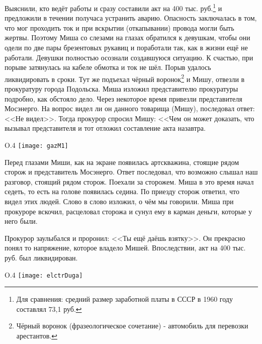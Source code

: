 Выяснили, кто ведёт работы и сразу составили акт на 400 тыс. руб.\footnote{Для сравнения: средний размер заработной платы в СССР в 1960 году составлял 73,1 руб.} и предложили в течении получаса устранить аварию. Опасность заключалась в том, что мог проходить ток и при вскрытии (откапывании) провода могли быть жертвы. Поэтому Миша со слезами на глазах обратился к девушкам, чтобы они одели по две пары брезентовых рукавиц и поработали так, как в жизни ещё не работали. Девушки полностью осознали создавшуюся ситуацию. К счастью, при порыве затянулась на кабеле обмотка и ток не шёл. Порыв удалось ликвидировать в сроки. Тут же подъехал чёрный воронок\footnote{Чёрный воронок (фразеологическое сочетание) - автомобиль для перевозки арестантов.} и Мишу, отвезли в прокуратуру города Подольска. Миша изложил представителю прокуратуры подробно, как обстояло дело. Через некоторое время привезли представителя Мосэнерго. На вопрос видел ли он данного товарища (Мишу), последовал ответ: <<Не видел>>. Тогда прокурор спросил Мишу: <<Чем он может доказать, что вызывал представителя и тот отложил составление акта назавтра.

\begin{wrapfigure}{O}{.4\textwidth}
\centering
\texttt{[image: gazM1]}
\caption[Чёрный воронок. Автомобиль ГАЗ-М\=/1 в Музее отечественной военной истории.]{Чёрный воронок. Автомобиль ГАЗ-М\=/1 в Музее отечественной военной истории\footnotemark.}
\label{fig:gazM1}
\end{wrapfigure}

Перед глазами Миши, как на экране появилась артскважина, стоящие рядом сторож и представитель Мосэнерго. Ответ последовал, что возможно слышал наш разговор, стоящий рядом сторож. Поехали за сторожем. Миша в это время начал седеть, то есть на голове появилась седина. По приезду сторож ответил, что видел этих людей. Слово в слово изложил, о чём мы говорили. Миша при прокуроре вскочил, расцеловал сторожа и сунул ему в карман деньги, которые у него были.

Прокурор заулыбался и проронил: <<Ты ещё даёшь взятку>>. Он прекрасно понял то напряжение, которое владело Мишей. Впоследствии, акт на 400 тыс. руб. был ликвидирован.

\begin{wrapfigure}{O}{.4\textwidth}
\centering
\texttt{[image: elctrDuga]}
\caption{Вольтова (электрическая) дуга.}
\label{fig:elctrDuga}
\end{wrapfigure}

